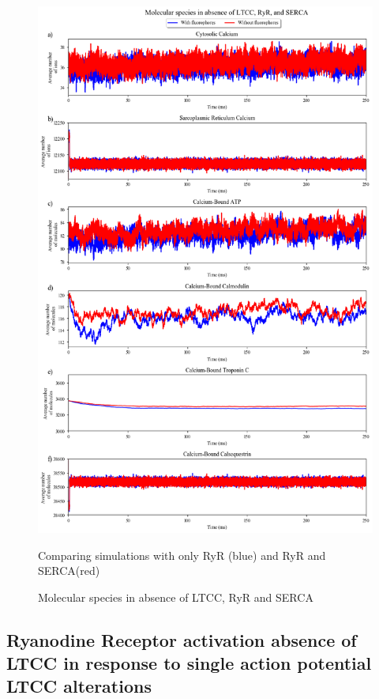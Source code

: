 \documentclass[12pt]{ucsddissertation}
\begin{document}
\setcounter{figure}{4}
\begin{figure}
\centering
	\includegraphics[scale=0.45]{buffer_fluo_molecules_c_Comparison.png}
	\caption{Molecular species in absence of LTCC, RyR and SERCA} Comparing simulations with only RyR (blue) and RyR and SERCA(red)
\label{fig:buffer_fluo} 
\end{figure}

\subsection{Ryanodine Receptor activation absence of LTCC in response to single action potential  LTCC alterations}
\end{document}

